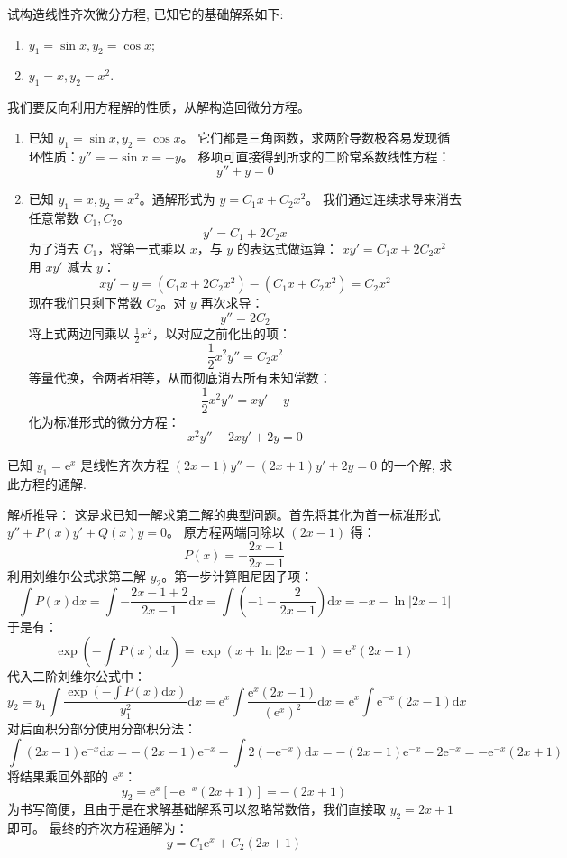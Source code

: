 \documentclass[lang=cn,11pt]{elegantbook}
\begin{document}
\begin{exercise}[根据基础解系反求微分方程]
试构造线性齐次微分方程, 已知它的基础解系如下:
\begin{enumerate}
    \item[(1)] $y_1=\sin x,y_2=\cos x$;
    \item[(2)] $y_1=x,y_2=x^2$.
\end{enumerate}
\end{exercise}
\begin{solution}
我们要反向利用方程解的性质，从解构造回微分方程。
\begin{enumerate}
    \item[(1)] 已知 $y_1=\sin x, y_2=\cos x$。
    它们都是三角函数，求两阶导数极容易发现循环性质：$y'' = -\sin x = -y$。
    移项可直接得到所求的二阶常系数线性方程：
    \[
    \boxed{y'' + y = 0}
    \]
    \item[(2)] 已知 $y_1=x, y_2=x^2$。通解形式为 $y = C_1 x + C_2 x^2$。
    我们通过连续求导来消去任意常数 $C_1, C_2$。
    \[
    y' = C_1 + 2C_2 x
    \]
    为了消去 $C_1$，将第一式乘以 $x$，与 $y$ 的表达式做运算：
    $x y' = C_1 x + 2C_2 x^2$
    用 $xy'$ 减去 $y$：
    \[
    xy' - y = (C_1 x + 2C_2 x^2) - (C_1 x + C_2 x^2) = C_2 x^2
    \]
    现在我们只剩下常数 $C_2$。对 $y$ 再次求导：
    \[
    y'' = 2C_2
    \]
    将上式两边同乘以 $\frac{1}{2}x^2$，以对应之前化出的项：
    \[
    \frac{1}{2}x^2 y'' = C_2 x^2
    \]
    等量代换，令两者相等，从而彻底消去所有未知常数：
    \[
    \frac{1}{2}x^2 y'' = xy' - y
    \]
    化为标准形式的微分方程：
    \[
    \boxed{x^2 y'' - 2x y' + 2y = 0}
    \]
\end{enumerate}
\end{solution}

\begin{exercise}[刘维尔公式应用]
已知 $y_1=\mathrm{e}^x$ 是线性齐次方程 $(2x-1)y''-(2x+1)y'+2y=0$ 的一个解, 求此方程的通解.
\end{exercise}
\begin{solution}
解析推导：
这是求已知一解求第二解的典型问题。首先将其化为首一标准形式 $y'' + P(x)y' + Q(x)y = 0$。
原方程两端同除以 $(2x-1)$ 得：
\[
P(x) = -\frac{2x+1}{2x-1}
\]
利用刘维尔公式求第二解 $y_2$。第一步计算阻尼因子项：
\[
\int P(x)\mathrm{d}x = \int -\frac{2x-1+2}{2x-1}\mathrm{d}x = \int \left(-1 - \frac{2}{2x-1}\right)\mathrm{d}x = -x - \ln|2x-1|
\]
于是有：
\[
\exp\left(-\int P(x)\mathrm{d}x\right) = \exp\left(x + \ln|2x-1|\right) = \mathrm{e}^x (2x-1)
\]
代入二阶刘维尔公式中：
\[
y_2 = y_1 \int \frac{\exp\left(-\int P(x)\mathrm{d}x\right)}{y_1^2} \mathrm{d}x = \mathrm{e}^x \int \frac{\mathrm{e}^x(2x-1)}{(\mathrm{e}^x)^2} \mathrm{d}x = \mathrm{e}^x \int \mathrm{e}^{-x}(2x-1) \mathrm{d}x
\]
对后面积分部分使用分部积分法：
\[
\int (2x-1)\mathrm{e}^{-x} \mathrm{d}x = -(2x-1)\mathrm{e}^{-x} - \int 2(-\mathrm{e}^{-x}) \mathrm{d}x = -(2x-1)\mathrm{e}^{-x} - 2\mathrm{e}^{-x} = -\mathrm{e}^{-x}(2x+1)
\]
将结果乘回外部的 $\mathrm{e}^x$：
\[
y_2 = \mathrm{e}^x \left[ -\mathrm{e}^{-x}(2x+1) \right] = -(2x+1)
\]
为书写简便，且由于是在求解基础解系可以忽略常数倍，我们直接取 $y_2 = 2x+1$ 即可。
最终的齐次方程通解为：
\[
\boxed{y = C_1\mathrm{e}^x + C_2(2x+1)}
\]
\end{solution}
\end{document}
